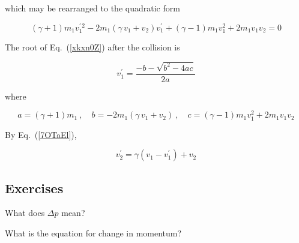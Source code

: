 \documentclass[main.tex]{subfiles}
\begin{document}
which may be rearranged to the quadratic form



\begin{equation} \label{xkxn0Z}
    (\gamma + 1) m_1 v_1^{\prime\,2}  - 2 m_1 \left(\gamma\, v_1 + v_2\right) v_1^{\prime} + \left(\gamma - 1\right) m_1 v_1^2 + 2 m_1 v_1 v_2 = 0
\end{equation}

The root of Eq.~(\ref{xkxn0Z}) after the collision is

\begin{equation*}
    v_1^{\prime} = \frac{-b - \sqrt{b^2 - 4ac}}{2a}
\end{equation*}

where

\begin{equation*}
    a = (\gamma + 1) m_1\ , \quad
    b = - 2 m_1 \left(\gamma\, v_1 + v_2\right)\ , \quad
    c = \left(\gamma - 1\right) m_1 v_1^2 + 2 m_1 v_1 v_2
\end{equation*}

By Eq.~(\ref{7OTaEl}), 

\begin{equation*}
    v_2^{\prime} = \gamma \left(v_1 - v_1^{\prime}\right) + v_2
\end{equation*}


\clearpage
\printnoidxglossaries

\clearpage

\subsection{Exercises}


\begin{exercise}
    What does $\Delta p$ mean?
\end{exercise}

\begin{exercise}
    What is the equation for change in momentum? 
\end{exercise}
\end{document}
